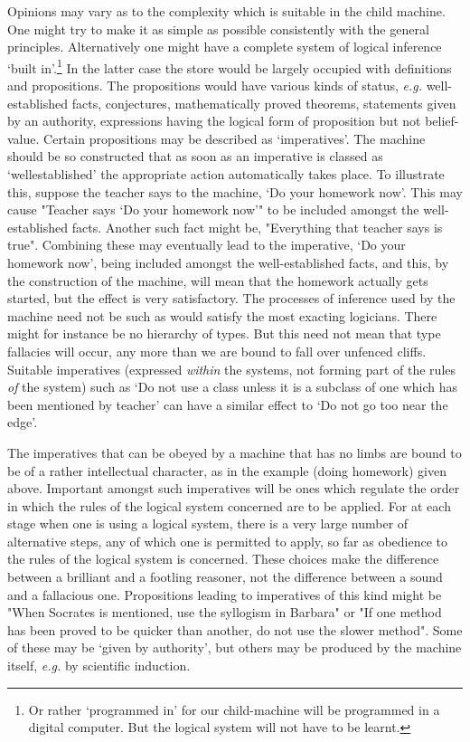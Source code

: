     Opinions may vary as to the complexity which is suitable in the child machine. One might try to make it as simple as possible consistently with the general principles. Alternatively one might have a complete system of logical inference ‘built in'.\footnote[1]{Or rather ‘programmed in' for our child-machine will be programmed in a digital computer. But the logical system will not have to be learnt.} In the latter case the store would be largely occupied with definitions and propositions. The propositions would have various kinds of status, \textit{e.g.} well-established facts, conjectures, mathematically proved theorems, statements given by an authority, expressions having the logical form of proposition but not belief-value. Certain propositions may be described as ‘imperatives'. The machine should be so constructed that as soon as an imperative is classed as ‘wellestablished' the appropriate action automatically takes place. To illustrate this, suppose the teacher says to the machine, ‘Do your homework now'. This may cause "Teacher says ‘Do your homework now'" to be included amongst the well-established facts. Another such fact might be, "Everything that teacher says is true". Combining these may eventually lead to the imperative, ‘Do your homework now', being included amongst the well-established facts, and this, by the construction of the machine, will mean that the homework actually gets started, but the effect is very satisfactory. The processes of inference used by the machine need not be such as would satisfy the most exacting logicians. There might for instance be no hierarchy of types. But this need not mean that type fallacies will occur, any more than we are bound to fall over unfenced cliffs. Suitable imperatives (expressed \textit{within} the systems, not forming part of the rules \textit{of} the system) such as ‘Do not use a class unless it is a subclass of one which has been mentioned by teacher' can have a similar effect to ‘Do not go too near the edge'.

    The imperatives that can be obeyed by a machine that has no limbs are bound to be of a rather intellectual character, as in the example (doing homework) given above. Important amongst such imperatives will be ones which regulate the order in which the rules of the logical system concerned are to be applied. For at each stage when one is using a logical system, there is a very large number of alternative steps, any of which one is permitted to apply, so far as obedience to the rules of the logical system is concerned. These choices make the difference between a brilliant and a footling reasoner, not the difference between a sound and a fallacious one. Propositions leading to imperatives of this kind might be "When Socrates is mentioned, use the syllogism in Barbara" or "If one method has been proved to be quicker than another, do not use the slower method". Some of these may be ‘given by authority', but others may be produced by the machine itself, \textit{e.g.} by scientific induction.

